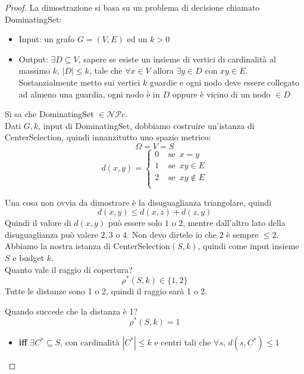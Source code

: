 \begin{proof}
	La dimostrazione si basa su un problema di decisione chiamato DominatingSet: 
	\begin{itemize}
		\item Input: un grafo $G = (V, E)$ ed un $k>0$
		\item Output: $\exists D \subseteq V$, sapere se esiste un insieme di vertici di cardinalità al massimo $k$, $|D| \leq k$, tale che $\forall x \in V$ allora $\exists y \in D$ con $xy \in E$. Sostanzialmente metto sui vertici $k$ guardie e ogni nodo deve essere collegato ad almeno una guardia, ogni nodo è in $D$ oppure è vicino di un nodo $\in D$
	\end{itemize}
	
	Si sa che DominatingSet $\in \mathcal{NP}c$.\\
	
	Dati $G,k$, input di DominatingSet, dobbiamo costruire un'istanza di CenterSelection, quindi innanzitutto uno spazio metrico:
	$$ \Omega = V = S $$
	$$ d (x,y) = 
	\begin{cases}
		0 & \text{ se } \, x=y \\
		1 & \text{ se } \, xy \in E \\
		2 & \text{ se } \, xy \notin E \\
	\end{cases}
	$$
	
	Una cosa non ovvia da dimostrare è la disuguaglianza triangolare, quindi 
	$$ d(x,y) \leq d(x,z) + d(z,y) $$
	Quindi il valore di $ d(x,y)$ può essere solo $1$ o $2$, mentre dall'altro lato della disuguaglianza può valere $2,3$ o $4$. Non devo dirtelo io che $2$ è sempre $\leq 2$.\\
	
	Abbiamo la nostra istanza di CenterSelection$(S,k)$, quindi come input insieme $S$ e budget $k$. \\
	
	Quanto vale il raggio di copertura?
	$$ \rho^\ast (S,k) \in \{1,2\}$$
	Tutte le distanze sono 1 o 2, quindi il raggio sarà 1 o 2.\\
	
	\newpage
	
	Quando succede che la distanza è 1? 
	$$ \rho^\ast (S,k) = 1 $$
	\begin{itemize}[label*=]
		\item \textbf{iff} $\exists C^\ast \subseteq S$, con cardinalità $|C^\ast| \leq k$ e centri tali che $\forall s$, $d(s,C^\ast) \leq 1$ \\
		

\end{itemize}
\end{proof}
